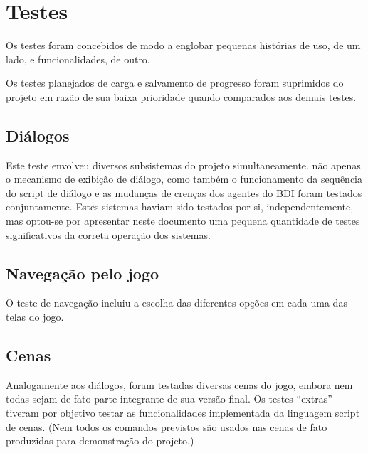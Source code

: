 \chapter{Testes}


Os testes foram concebidos de modo a englobar pequenas histórias de
uso, de um lado, e funcionalidades, de outro.

Os testes planejados de carga e salvamento de progresso foram suprimidos do projeto em razão de sua baixa prioridade quando comparados aos demais testes.

\section{Diálogos}

Este teste envolveu diversos subsistemas do projeto simultaneamente. não apenas o mecanismo de exibição de diálogo, como também o funcionamento da sequência do script de diálogo e as mudanças de crenças dos agentes do BDI foram testados conjuntamente. Estes sistemas haviam sido testados por si, independentemente, mas optou-se por apresentar neste documento uma pequena quantidade de testes significativos da correta operação dos sistemas.

\section{Navegação pelo jogo}

O teste de navegação incluiu a escolha das diferentes opções em cada uma das telas do jogo.

\section{Cenas}

Analogamente aos diálogos, foram testadas diversas cenas do jogo, embora nem todas sejam de fato parte integrante de sua versão final. Os testes ``extras'' tiveram por objetivo testar as funcionalidades implementada da linguagem script de cenas. (Nem todos os comandos previstos são usados nas cenas de fato produzidas para demonstração do projeto.)

